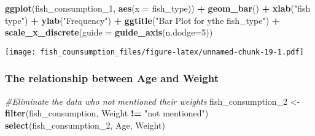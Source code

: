 \documentclass[
]{article}
\newenvironment{Shaded}{\begin{snugshade}}{\end{snugshade}}
\newcommand{\AttributeTok}[1]{\textcolor[rgb]{0.13,0.29,0.53}{#1}}
\newcommand{\CommentTok}[1]{\textcolor[rgb]{0.56,0.35,0.01}{\textit{#1}}}
\newcommand{\DecValTok}[1]{\textcolor[rgb]{0.00,0.00,0.81}{#1}}
\newcommand{\FunctionTok}[1]{\textcolor[rgb]{0.13,0.29,0.53}{\textbf{#1}}}
\newcommand{\NormalTok}[1]{#1}
\newcommand{\OtherTok}[1]{\textcolor[rgb]{0.56,0.35,0.01}{#1}}
\newcommand{\SpecialCharTok}[1]{\textcolor[rgb]{0.81,0.36,0.00}{\textbf{#1}}}
\newcommand{\StringTok}[1]{\textcolor[rgb]{0.31,0.60,0.02}{#1}}
\begin{document}
\begin{Shaded}
\begin{Highlighting}[]
\FunctionTok{ggplot}\NormalTok{(fish\_consumption\_1, }\FunctionTok{aes}\NormalTok{(}\AttributeTok{x =}\NormalTok{ fish\_type)) }\SpecialCharTok{+}
  \FunctionTok{geom\_bar}\NormalTok{() }\SpecialCharTok{+}
  \FunctionTok{xlab}\NormalTok{(}\StringTok{"fish type"}\NormalTok{) }\SpecialCharTok{+}
  \FunctionTok{ylab}\NormalTok{(}\StringTok{"Frequency"}\NormalTok{) }\SpecialCharTok{+}
  \FunctionTok{ggtitle}\NormalTok{(}\StringTok{"Bar Plot for ythe fish\_type"}\NormalTok{) }\SpecialCharTok{+} \FunctionTok{scale\_x\_discrete}\NormalTok{(}\AttributeTok{guide =} \FunctionTok{guide\_axis}\NormalTok{(}\AttributeTok{n.dodge=}\DecValTok{5}\NormalTok{))}
\end{Highlighting}
\end{Shaded}

\texttt{[image: fish\_counsumption\_files/figure-latex/unnamed-chunk-19-1.pdf]}

\hypertarget{the-relationship-between-age-and-weight}{%
\subsubsection{The relationship between Age and
Weight}\label{the-relationship-between-age-and-weight}}

\begin{Shaded}
\begin{Highlighting}[]
\CommentTok{\#Eliminate the data who not mentioned their weights}
\NormalTok{fish\_consumption\_2 }\OtherTok{\textless{}{-}} \FunctionTok{filter}\NormalTok{(fish\_consumption, Weight }\SpecialCharTok{!=} \StringTok{"not mentioned"}\NormalTok{)}
                         \FunctionTok{select}\NormalTok{(fish\_consumption\_2, Age, Weight)}
\end{Highlighting}
\end{Shaded}
\end{document}
